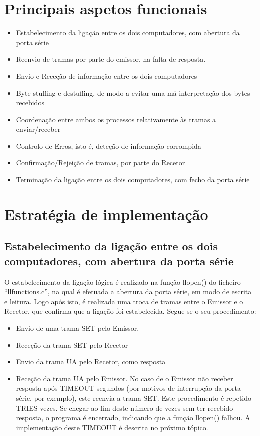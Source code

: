 \documentclass[article, a4paper, 11pt, oneside]{memoir}
\begin{document}
\section{Principais aspetos funcionais}
\begin{itemize}
 \item Estabelecimento da ligação entre os dois computadores, com abertura da porta série
 \item Reenvio de tramas por parte do emissor, na falta de resposta.
 \item Envio e Receção de informação entre os dois computadores
 \item Byte stuffing e destuffing, de modo a evitar uma má interpretação dos bytes recebidos
 \item Coordenação entre ambos os processos relativamente às tramas a enviar/receber
 \item Controlo de Erros, isto é, deteção de informação corrompida
 \item Confirmação/Rejeição de tramas, por parte do Recetor
 \item Terminação da ligação entre os dois computadores, com fecho da porta série
\end{itemize}

\section{Estratégia de implementação}

\subsection{Estabelecimento da ligação entre os dois computadores, com abertura da porta série}
O estabelecimento da ligação lógica é realizado na função llopen() do ficheiro “llfunctions.c”, na qual é efetuada a abertura da porta série, em modo de escrita e leitura. Logo após isto, é realizada uma troca de tramas entre o Emissor e o Recetor, que confirma que a ligação foi estabelecida. Segue-se o seu procedimento:
\begin{itemize}
	\item Envio de uma trama SET pelo Emissor.
\item Receção da trama SET pelo Recetor
\item Envio da trama UA pelo Recetor, como resposta
\item Receção da trama UA pelo Emissor. No caso de o Emissor não receber resposta após TIMEOUT segundos (por motivos de interrupção da porta série, por exemplo), este reenvia a trama SET. Este procedimento é repetido TRIES vezes. Se chegar ao fim deste número de vezes sem ter recebido resposta, o programa é encerrado, indicando que a função llopen() falhou. A implementação deste TIMEOUT é descrita no próximo tópico.
\end{itemize}
\end{document}
